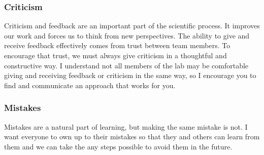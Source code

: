 \documentclass[10pt, a4paper, twocolumn]{article} %
\begin{document}
\subsubsection{Criticism}
Criticism and feedback are an important part of the scientific process. It improves our work and forces us to think from new perspectives. The ability to give and receive feedback effectively comes from trust between team members. To encourage that trust, we must always give criticism in a thoughtful and constructive way. I understand not all members of the lab may be comfortable giving and receiving feedback or criticism in the same way, so I encourage you to find and communicate an approach that works for you.
\subsubsection{Mistakes}
Mistakes are a natural part of learning, but making the same mistake is not. I want everyone to own up to their mistakes so that they and others can learn from them and we can take the any steps possible to avoid them in the future.
\end{document}
